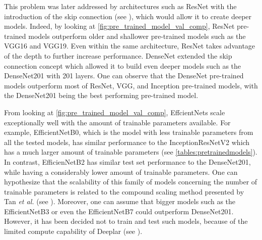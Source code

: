     This problem was later addressed by architectures such as ResNet with the introduction of the skip connection (see ), which would allow it to create deeper models. Indeed, by looking at \autoref{fig:pre_trained_model_val_comp}, ResNet pre-trained models outperform older and shallower pre-trained models such as the VGG16 and VGG19. Even within the same architecture, ResNet takes advantage of the depth to further increase performance. DenseNet extended the skip connection concept which allowed it to build even deeper models such as the DenseNet201 with 201 layers. One can observe that the DenseNet pre-trained models outperform most of ResNet, VGG, and Inception pre-trained models, with the DenseNet201 being the best performing pre-trained model. \par
    
    From looking at \autoref{fig:pre_trained_model_val_comp}, EffcientNets scale exceptionally well with the amount of trainable parameters available. For example, EfficientNetB0, which is the model with less trainable parameters from all the tested models, has similar performance to the InceptionResNetV2 which has a much larger amount of trainable parameters (see \autoref{tables:pretrainedmodels}). In contrast, EfficienNetB2 has similar test set performance to the DenseNet201, while having a considerably lower amount of trainable parameters. One can hypothesize that the scalability of this family of models concerning the number of trainable parameters is related to the compound scaling method presented by Tan \textit{et al.} \cite{efficientnet} (see ). Moreover, one can assume that bigger models such as the EfficientNetB3 or even the EfficientNetB7 could outperform DenseNet201. However, it has been decided not to train and test such models, because of the limited compute capability of Deeplar (see ). \par 
    
